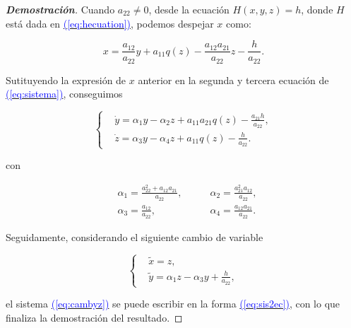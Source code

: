\documentclass[12pt,a4paper]{report} %
\newcommand{\eref}[1]{\hyperref[#1]{\textcolor{blue}{(\ref*{#1})}}}
\newcommand{\eref}[1]{\hyperref[#1]{\textcolor{blue}{\textit{(\ref*{#1})}}}}
\begin{document}
	\vspace{0.5cm}
		
	\begin{proof}[\textbf{Demostración}]
		 Cuando $a_{22}\neq0$, desde la ecuación $H(x,y,z)=h$, donde $H$ está dada en \eref{eq:hecuation}, podemos despejar $x$ como:
		
		\begin{equation}
			\label{eq:xeqn}
			x=\frac{a_{12}}{a_{22}}y+a_{11}q(z)-\frac{a_{12}a_{21}}{a_{22}}z-\frac{h}{a_{22}}.
		\end{equation}\smallskip
		
		\noindent Sutituyendo la expresión de $x$ anterior en la segunda y tercera ecuación de \eref{eq:sistema}, conseguimos
		
		\begin{equation}
			\label{eq:cambyz}
			\left\{
			\begin{aligned}
				&\dot{y}=\alpha_1y-\alpha_2z+a_{11}a_{21}q(z)-\frac{a_{21}h}{a_{22}}, \\[2mm]
				&\dot{z}=\alpha_3y-\alpha_4z+a_{11}q(z)-\frac{h}{a_{22}}.
			\end{aligned}
			\right.
		\end{equation}
		
	    \noindent con
		
		\begin{equation}
			\label{eq:alphamatriz}
			\begin{aligned}
				&\alpha_1=\frac{a_{22}^2+a_{12}a_{21}}{a_{22}}, \qquad &\alpha_2=\frac{a_{21}^2a_{12}}{a_{22}},\\[2mm]
				&\alpha_3=\frac{a_{12}}{a_{22}}, \qquad &\alpha_4=\frac{a_{12}a_{21}}{a_{22}}.
			\end{aligned}
		\end{equation}\smallskip
		
		\noindent Seguidamente, considerando el siguiente cambio de variable
		
		\begin{equation}
			\label{eq:xytilde}
			\left\{
			\begin{aligned}
				&\tilde{x}=z, \\[2mm]
				&\tilde{y}=\alpha_1z-\alpha_3y+\frac{h}{a_{22}},
			\end{aligned}
			\right.
		\end{equation}\smallskip
		
		 \noindent el sistema \eref{eq:cambyz} se puede escribir en la forma \eref{eq:sis2ec}, con lo que finaliza la demostración del resultado.
		
	\end{proof}
	
\end{document}
